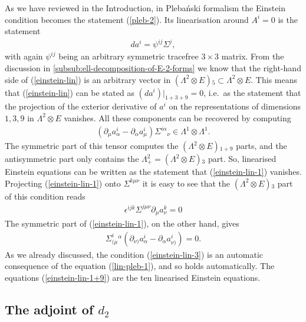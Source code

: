 \documentclass[10pt]{report}
\newcommand{\pleb}[0]{Pleba\'nski}
\theoremstyle{definition}
\begin{document}
As we have reviewed in the Introduction, in \pleb{} formalism the Einstein condition becomes the statement (\ref{pleb-2}). Its linearisation around $A^i=0$ is the statement
\begin{align}\label{einstein-lin}
d a^i = \psi^{ij} \Sigma^j,
\end{align}
with again $\psi^{ij}$ being an arbitrary symmetric tracefree $3\times 3$ matrix. From the discussion in \cref{subsub:ell-decomposition-of-E-2-forms} we know that the right-hand side of (\ref{einstein-lin}) is an arbitrary vector in $(\Lambda^2\otimes E){}_5\subset \Lambda^2\otimes E$. This means that (\ref{einstein-lin}) can be stated as $(da^i)\Big|_{1+3+9}=0$, i.e.\ as the statement that the projection of the exterior derivative of $a^i$ on the representations of dimensions $1,3,9$ in $\Lambda^2\otimes E$ vanishes. All these components can be recovered by computing
\begin{align}\label{einstein-lin-1}
(\partial_\mu a^i_\alpha - \partial_\alpha a^i_\mu) \Sigma^{i\alpha}{}_\nu \in \Lambda^1\otimes \Lambda^1.
\end{align}
The symmetric part of this tensor computes the $(\Lambda^2\otimes E){}_{1+9}$ parts, and the antisymmetric part only contains the $\Lambda^2_+ = (\Lambda^2\otimes E){}_3$ part. So, linearised Einstein equations can be written as the statement that (\ref{einstein-lin-1}) vanishes. Projecting (\ref{einstein-lin-1}) onto $\Sigma^{k\mu\nu}$ it is easy to see that the $(\Lambda^2\otimes E){}_3$ part of this condition reads
\begin{align}\label{einstein-lin-3}
\epsilon^{ijk} \Sigma^{j\mu\nu} \partial_\mu a_\nu^k = 0
\end{align}
The symmetric part of (\ref{einstein-lin-1}), on the other hand, gives
\begin{align}\label{einstein-lin-1+9}
\Sigma^i_{(\mu}{}^\alpha ( \partial_{\nu)} a^i_\alpha - \partial_\alpha a^i_{\nu)})=0.
\end{align}
As we already discussed, the condition (\ref{einstein-lin-3}) is an automatic consequence of the equation (\ref{lin-pleb-1}), and so holds automatically. The equations (\ref{einstein-lin-1+9}) are the ten linearised Einstein equations. 

\subsection{The adjoint of \texorpdfstring{$d_2$}{}}
\end{document}
